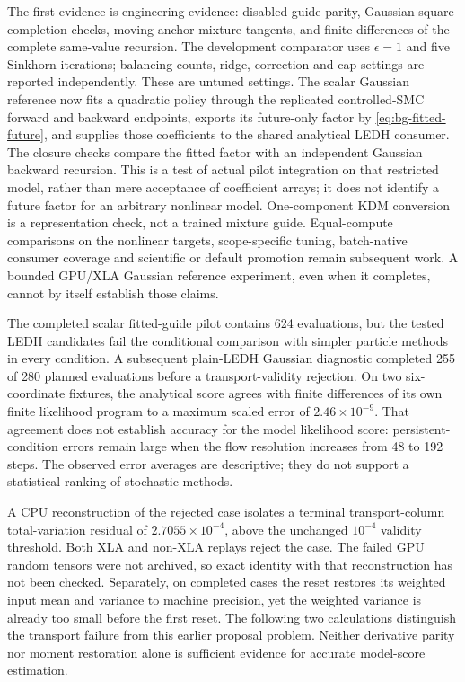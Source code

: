 The first evidence is engineering evidence: disabled-guide parity,
Gaussian square-completion checks, moving-anchor mixture tangents, and
finite differences of the complete same-value recursion. The development
comparator uses $\epsilon=1$ and five Sinkhorn iterations; balancing counts,
ridge, correction and cap settings are reported independently. These are
untuned settings. The scalar Gaussian reference now fits a quadratic policy
through the replicated controlled-SMC forward and backward endpoints, exports
its future-only factor by \eqref{eq:bg-fitted-future}, and supplies those
coefficients to the shared analytical LEDH consumer. The closure checks compare
the fitted factor with an independent Gaussian backward recursion. This is a
test of actual pilot integration on that restricted model, rather than mere
acceptance of coefficient arrays; it does not identify a future factor for an
arbitrary nonlinear model. One-component KDM conversion is a representation
check, not a trained mixture guide. Equal-compute comparisons on the nonlinear
targets, scope-specific tuning, batch-native consumer coverage and scientific
or default promotion remain subsequent work. A bounded GPU/XLA Gaussian
reference experiment, even when it completes, cannot by itself establish
those claims.

The completed scalar fitted-guide pilot contains 624 evaluations, but the
tested LEDH candidates fail the conditional comparison with simpler particle
methods in every condition. A subsequent plain-LEDH Gaussian diagnostic
completed 255 of 280 planned evaluations before a transport-validity rejection.
On two six-coordinate fixtures, the analytical score agrees with finite
differences of its own finite likelihood program to a maximum scaled error of
$2.46\times 10^{-9}$. That agreement does not establish accuracy for the model
likelihood score: persistent-condition errors remain large when the flow
resolution increases from 48 to 192 steps. The observed error averages are
descriptive; they do not support a statistical ranking of stochastic methods.

A CPU reconstruction of the rejected case isolates a terminal transport-column
total-variation residual of $2.7055\times 10^{-4}$, above the unchanged
$10^{-4}$ validity threshold. Both XLA and non-XLA replays reject the case.
The failed GPU random tensors were not archived, so exact identity with that
reconstruction has not been checked. Separately, on completed cases the reset
restores its weighted input mean and variance to machine precision, yet the
weighted variance is already too small before the first reset. The following
two calculations distinguish the transport failure from this earlier proposal
problem. Neither derivative parity nor moment restoration alone is sufficient
evidence for accurate model-score estimation.

